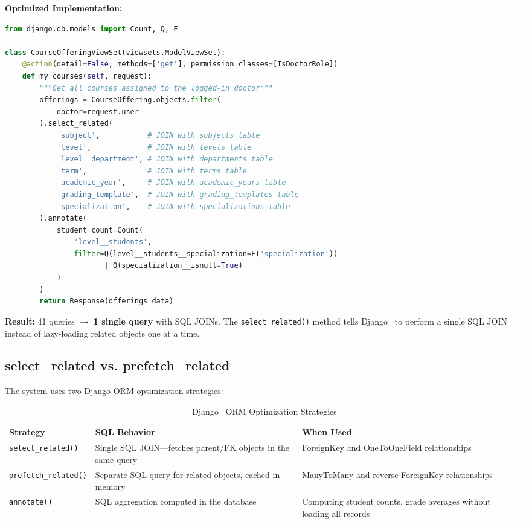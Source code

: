 \textbf{Optimized Implementation:}

\begin{lstlisting}[language=Python, caption=Doctor's Course View with Query Optimization (from \texttt{academic/views.py})]
from django.db.models import Count, Q, F

class CourseOfferingViewSet(viewsets.ModelViewSet):
    @action(detail=False, methods=['get'], permission_classes=[IsDoctorRole])
    def my_courses(self, request):
        """Get all courses assigned to the logged-in doctor"""
        offerings = CourseOffering.objects.filter(
            doctor=request.user
        ).select_related(
            'subject',           # JOIN with subjects table
            'level',             # JOIN with levels table
            'level__department', # JOIN with departments table
            'term',              # JOIN with terms table
            'academic_year',     # JOIN with academic_years table
            'grading_template',  # JOIN with grading_templates table
            'specialization',    # JOIN with specializations table
        ).annotate(
            student_count=Count(
                'level__students',
                filter=Q(level__students__specialization=F('specialization')) 
                       | Q(specialization__isnull=True)
            )
        )
        return Response(offerings_data)
\end{lstlisting}

\textbf{Result:} 41 queries $\rightarrow$ \textbf{1 single query} with SQL JOINs. The \texttt{select\_related()} method tells Django~\cite{django} to perform a single SQL JOIN instead of lazy-loading related objects one at a time.

\subsection{select\_related vs. prefetch\_related}

The system uses two Django ORM optimization strategies:

\begin{table}[H]
    \centering
    \renewcommand{\arraystretch}{1.3}
    \small
    \begin{tabular}{|l|p{4.5cm}|p{3.5cm}|}
        \hline
        \textbf{Strategy} & \textbf{SQL Behavior} & \textbf{When Used} \\
        \hline
        \texttt{select\_related()} & Single SQL JOIN---fetches parent/FK objects in the same query & ForeignKey and OneToOneField relationships \\
        \hline
        \texttt{prefetch\_related()} & Separate SQL query for related objects, cached in memory & ManyToMany and reverse ForeignKey relationships \\
        \hline
        \texttt{annotate()} & SQL aggregation computed in the database & Computing student counts, grade averages without loading all records \\
        \hline
    \end{tabular}
    \caption{Django~\cite{django} ORM Optimization Strategies}
    \label{tab:orm-strategies}
\end{table}

